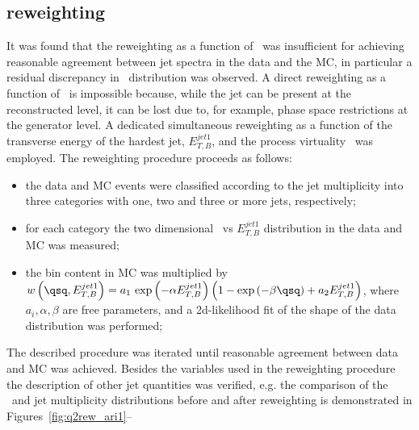 \subsection{\ariadne reweighting}
It was found that the reweighting as a function of \qsq~was insufficient for achieving reasonable agreement between jet spectra in the data and the \ariadne MC, in particular a residual discrepancy in \etjetb~distribution was observed. A direct reweighting as a function of \etjetb~is impossible because, while the jet can be present at the reconstructed level, it can be lost due to, for example, phase space restrictions at the generator level. A dedicated simultaneous reweighting as a function of the transverse energy of the hardest jet, $E_{T,B}^{jet1}$, and the process virtuality \qsq~was employed. The reweighting procedure proceeds as follows:
\begin{itemize}
	\item the data and MC events were classified according to the jet multiplicity into three categories with one, two and three or more jets, respectively;
	\item for each category the two dimensional \qsq~vs $E_{T,B}^{jet1}$ distribution in the data and MC was measured;
	\item the bin content in MC was multiplied by \\$w\left( \qsq, E_{T,B}^{jet1} \right)=a_1\,\exp{\left( -\alpha E_{T,B}^{jet1}\right) }\left(1- \exp{\left( -\beta\qsq\right) } + a_2 E_{T,B}^{jet1} \right) $, where $a_i, \alpha, \beta$ are free parameters, and a 2d-likelihood fit of the shape of the data distribution was performed;
\end{itemize}
The described procedure was iterated until reasonable agreement between data and MC was achieved. Besides the variables used in the reweighting procedure the description of other jet quantities was verified, e.g. the comparison of the \etajetb~and jet multiplicity distributions before and after reweighting is demonstrated in Figures~\ref{fig:q2rew_ari1}--
